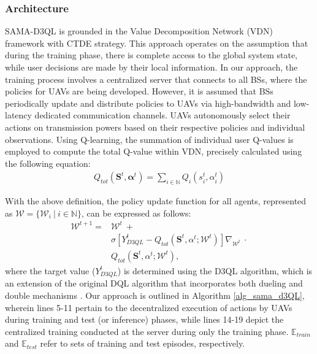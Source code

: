 \documentclass[conference]{IEEEtran}
\begin{document}
\subsubsection{Architecture}\label{ss_architecture}

SAMA-D3QL is grounded in the Value Decomposition Network (VDN) framework \cite{sunehag2017value} with CTDE strategy. This approach operates on the assumption that during the training phase, there is complete access to the global system state, while user decisions are made by their local information. In our approach, the training process involves a centralized server that connects to all BSs, where the policies for UAVs are being developed. However, it is assumed that BSs periodically update and distribute policies to UAVs via high-bandwidth and low-latency dedicated communication channels. UAVs autonomously select their actions on transmission powers based on their respective policies and individual observations. Using Q-learning, the summation of individual user Q-values is employed to compute the total Q-value within VDN, precisely calculated using the following equation:
\begin{align}\label{training}
Q_{tot}(\boldsymbol{S}^{t}, \boldsymbol{\alpha}^{t}) = \sum_{i \in \mathbb{N}}{}{Q_{i}({s}_{i}^{t}, \alpha_{i}^{t})}
\end{align}

With the above definition, the policy update function for all agents, represented as $\boldsymbol{\mathcal{W}}  = \{ \mathcal{W}_{i} \ | \ i \in \mathbb{N} \}$, can be expressed as follows:
\begin{align}
\label{eq_DQL_bellman}
\boldsymbol{\mathcal{W}}^{t+1} = & \boldsymbol{\mathcal{W}}^{t} \nonumber \ + \\
& \sigma[Y^t_{D3QL} - Q_{tot}(\boldsymbol{S}^{t}, \boldsymbol{\mathbb{\alpha}}^{t}; \boldsymbol{\mathcal{W}}^t)]\nabla_{\boldsymbol{\mathcal{W}}^{t}} \nonumber \ \cdot \\
& Q_{tot}(\boldsymbol{S}^{t}, \boldsymbol{\mathbb{\alpha}}^{t}; \boldsymbol{\mathcal{W}}^{t}),
\end{align}
where the target value ($Y^t_{D3QL}$) is determined using the D3QL algorithm, which is an extension of the original DQL algorithm that incorporates both dueling and double mechanisms \cite{mazandarani2024semantic}. Our approach is outlined in Algorithm \ref{alg_sama_d3QL}, wherein lines 5-11 pertain to the decentralized execution of actions by UAVs during training and test (or inference) phases, while lines 14-19 depict the centralized training conducted at the server during only the training phase. $\mathbb{E}_{train}$ and $\mathbb{E}_{test}$ refer to sets of training and test episodes, respectively.
\end{document}
